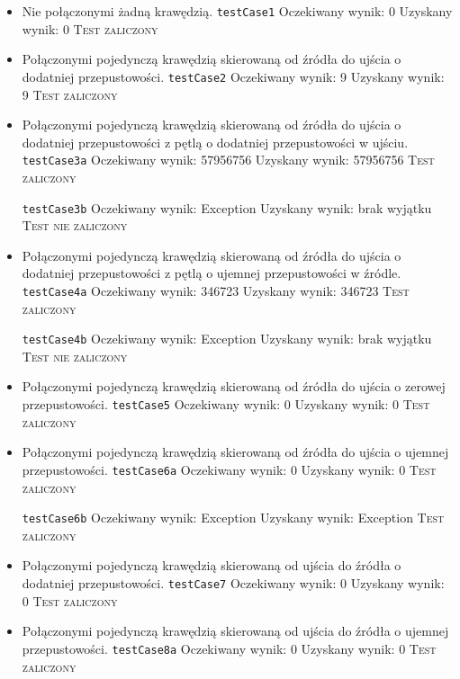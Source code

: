 \begin{itemize}[nosep]
    \item Nie połączonymi żadną krawędzią.
    \texttt{testCase1}
    Oczekiwany wynik: 0
    Uzyskany wynik: 0
    \textsc{Test zaliczony}

    \item Połączonymi pojedynczą krawędzią skierowaną od źródła do ujścia o dodatniej przepustowości.
    \texttt{testCase2}
    Oczekiwany wynik: 9
    Uzyskany wynik: 9
    \textsc{Test zaliczony}

    \item Połączonymi pojedynczą krawędzią skierowaną od źródła do ujścia o dodatniej przepustowości z pętlą o dodatniej przepustowości w ujściu.
    \texttt{testCase3a}
    Oczekiwany wynik: 57956756
    Uzyskany wynik: 57956756
    \textsc{Test zaliczony}

    \texttt{testCase3b}
    Oczekiwany wynik: Exception
    Uzyskany wynik: brak wyjątku
    \textsc{Test nie zaliczony}

    \item Połączonymi pojedynczą krawędzią skierowaną od źródła do ujścia o dodatniej przepustowości z pętlą o ujemnej przepustowości w źródle.
    \texttt{testCase4a}
    Oczekiwany wynik: 346723
    Uzyskany wynik: 346723
    \textsc{Test zaliczony}

    \texttt{testCase4b}
    Oczekiwany wynik: Exception
    Uzyskany wynik: brak wyjątku
    \textsc{Test nie zaliczony}

    \item Połączonymi pojedynczą krawędzią skierowaną od źródła do ujścia o zerowej przepustowości.
    \texttt{testCase5}
    Oczekiwany wynik: 0
    Uzyskany wynik: 0
    \textsc{Test zaliczony}

    \item Połączonymi pojedynczą krawędzią skierowaną od źródła do ujścia o ujemnej przepustowości.
    \texttt{testCase6a}
    Oczekiwany wynik: 0
    Uzyskany wynik: 0
    \textsc{Test zaliczony}

    \texttt{testCase6b}
    Oczekiwany wynik: Exception
    Uzyskany wynik: Exception
    \textsc{Test zaliczony}

    \item Połączonymi pojedynczą krawędzią skierowaną od ujścia do źródła o dodatniej przepustowości.
    \texttt{testCase7}
    Oczekiwany wynik: 0
    Uzyskany wynik: 0
    \textsc{Test zaliczony}

    \item Połączonymi pojedynczą krawędzią skierowaną od ujścia do źródła o ujemnej przepustowości.
    \texttt{testCase8a}
    Oczekiwany wynik: 0
    Uzyskany wynik: 0
    \textsc{Test zaliczony}


\end{itemize}
